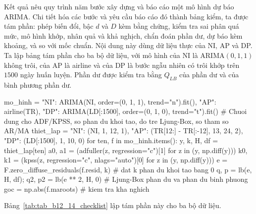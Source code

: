  Kết quả  nêu quy trình năm bước xây dựng và báo cáo một mô hình dự báo ARIMA. Chi tiết hóa các bước và yêu cầu báo cáo đó thành bảng kiểm, ta được tám phần: phép biến đổi, bậc $d$ và $D$ kèm bằng chứng, kiểm tra sai phân quá mức, mô hình khớp, nhân quả và khả nghịch, chẩn đoán phần dư, dự báo kèm khoảng, và so với mốc chuẩn.
 Nội dung này dùng dữ liệu thực của NI, AP và DP. Ta lập bảng tám phần cho ba bộ dữ liệu, với mô hình của NI là ARIMA$(0,1,1)$ không trôi, của AP là airline và của DP là bước ngẫu nhiên có trôi khớp trên $1500$ ngày huấn luyện. Phần dư được kiểm tra bằng $Q_{LB}$ của phần dư và của bình phương phần dư.
\begin{codeblock}
mo_hinh = {"NI": ARIMA(NI, order=(0, 1, 1), trend="n").fit(), "AP": airline(TR),
           "DP": ARIMA(LD[:1500], order=(0, 1, 0), trend="t").fit()}
# Chuoi dung cho ADF/KPSS, so phan du khoi tao, do tre Ljung-Box, so tham so AR/MA
thiet_lap = {"NI": (NI, 1, 12, 1), "AP": (TR[12:] - TR[:-12], 13, 24, 2),
             "DP": (LD[:1500], 1, 10, 0)}
for ten, f in mo_hinh.items():
    y, k, H, df = thiet_lap[ten]
    a0, a1 = (adfuller(z, regression="c")[1] for z in (y, np.diff(y)))
    k0, k1 = (kpss(z, regression="c", nlags="auto")[0] for z in (y, np.diff(y)))
    e = F.zero_diffuse_residuals(f.resid, k)        # dat k phan du khoi tao bang 0
    q, p = lb(e, H, df); q2, p2 = lb(e ** 2, H, 0)  # Ljung-Box phan du va phan du binh phuong
    goc = np.abs(f.maroots)                          # kiem tra kha nghich
\end{codeblock}
 Bảng~\ref{tab:tab_b12_14_checklist} lập tám phần này cho ba bộ dữ liệu.
